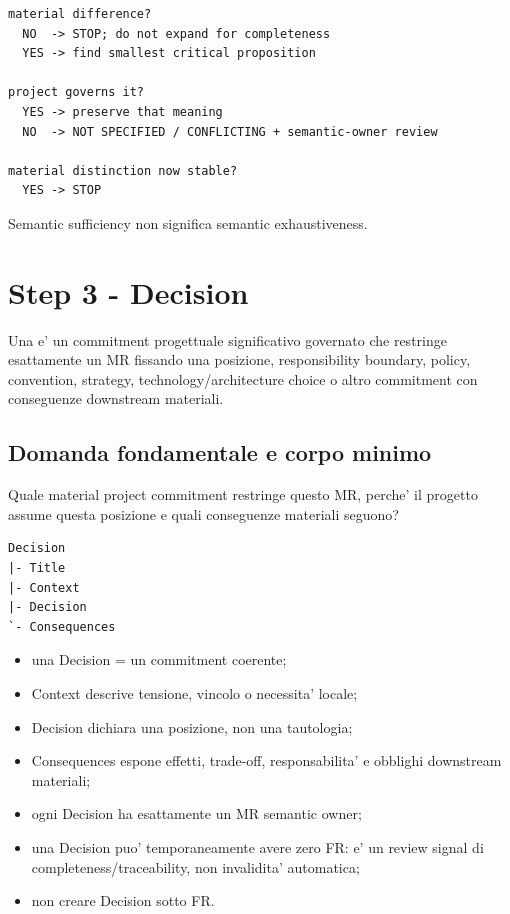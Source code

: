 \documentclass[11pt,a4paper]{article}
\begin{document}
\begin{ddtacore}[title={Regola di arresto della semantic sufficiency}]
\begin{lstlisting}
material difference?
  NO  -> STOP; do not expand for completeness
  YES -> find smallest critical proposition

project governs it?
  YES -> preserve that meaning
  NO  -> NOT SPECIFIED / CONFLICTING + semantic-owner review

material distinction now stable?
  YES -> STOP
\end{lstlisting}
Semantic sufficiency non significa semantic exhaustiveness.
\end{ddtacore}

\section{Step 3 - Decision}
\closedtag

Una \DEC{} e' un commitment progettuale significativo governato che restringe esattamente un MR fissando una posizione, responsibility boundary, policy, convention, strategy, technology/architecture choice o altro commitment con conseguenze downstream materiali.

\subsection{Domanda fondamentale e corpo minimo}
\begin{ddtacheck}
Quale material project commitment restringe questo MR, perche' il progetto assume questa posizione e quali conseguenze materiali seguono?
\end{ddtacheck}

\begin{lstlisting}
Decision
|- Title
|- Context
|- Decision
`- Consequences
\end{lstlisting}

\begin{itemize}
  \item una Decision = un commitment coerente;
  \item Context descrive tensione, vincolo o necessita' locale;
  \item Decision dichiara una posizione, non una tautologia;
  \item Consequences espone effetti, trade-off, responsabilita' e obblighi downstream materiali;
  \item ogni Decision ha esattamente un MR semantic owner;
  \item una Decision puo' temporaneamente avere zero FR: e' un review signal di completeness/traceability, non invalidita' automatica;
  \item non creare Decision sotto FR.
\end{itemize}
\end{document}
